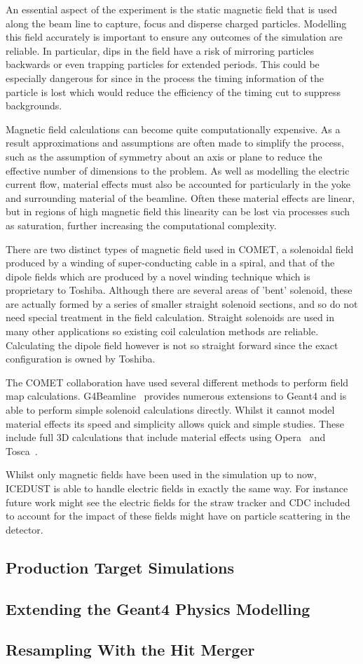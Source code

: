 An essential aspect of the \COMET experiment is the static magnetic field that is used along the beam line to capture, focus and disperse charged particles.
Modelling this field accurately is important to ensure any outcomes of the simulation are reliable.
In particular, dips in the field have a risk of mirroring particles backwards or even trapping particles for extended periods.
This could be especially dangerous for \COMET since in the process the timing information of the particle is lost which would reduce the efficiency of the timing cut to suppress backgrounds.

Magnetic field calculations can become quite computationally expensive.  
As a result approximations and assumptions are often made to simplify the process, such as the assumption of symmetry about an axis or plane to reduce the effective number of dimensions to the problem.
As well as modelling the electric current flow, material effects must also be accounted for particularly in the yoke and surrounding material of the beamline.
Often these material effects are linear, but in regions of high magnetic field this linearity can be lost via processes such as saturation, further increasing the computational complexity.

There are two distinct types of magnetic field used in COMET, a solenoidal field produced by a winding of super-conducting cable in a spiral, and that of the dipole fields which are produced by a novel winding technique which
is proprietary to Toshiba.  
Although there are several areas of 'bent' solenoid, these are actually formed by a series of smaller straight solenoid sections, and so do not need special treatment in the field calculation.
Straight solenoids are used in many other applications so existing coil calculation methods are reliable. 
Calculating the dipole field however is not so straight forward since the exact configuration is owned by Toshiba.

The COMET collaboration have used several different methods to perform field map calculations.
G4Beamline~\cite{G4Beamline} provides numerous extensions to Geant4 and is able to perform simple solenoid calculations directly.
Whilst it cannot model material effects its speed and simplicity allows quick and simple studies. 
These include full 3D calculations that include material effects using Opera~\cite{Opera} and Tosca~\cite{TOSCA}.

Whilst only magnetic fields have been used in the simulation up to now, ICEDUST is able to handle electric fields in exactly the same way.
For instance future work might see the electric fields for the straw tracker and CDC included to account for the impact of these fields might have on particle scattering in the detector.

\subsection{Production Target Simulations}

\subsection{Extending the Geant4 Physics Modelling}

\subsection{Resampling With the Hit Merger}
